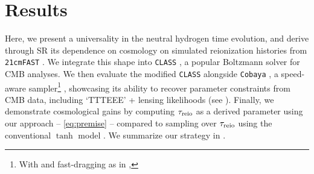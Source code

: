 \section*{Results}

Here, we present a universality in the neutral hydrogen time evolution,
and derive through SR its dependence on cosmology on simulated
reionization histories from \texttt{21cmFAST} \cite{Murray2020}.
We integrate this shape into \texttt{CLASS} \cite{Blas2011}, a popular
Boltzmann solver for CMB analyses.
We then evaluate the modified \texttt{CLASS} alongside \texttt{Cobaya}
\cite{Torrado2020}, a speed-aware sampler\cite{Lewis2002, Lewis2013}\footnote{With  and fast-dragging as
in \cite{Neal2005},  } , showcasing its ability to
recover parameter constraints from CMB data, including `TTTEEE' +
lensing likelihoods \cite{Planck2020c, Planck2020d} (see
).
Finally, we demonstrate cosmological gains by computing $\tau_{\mathrm{reio}}$ as
a derived parameter using our approach -- \cref{eq:premise} --
compared to sampling over $\tau_{\mathrm{reio}}$ using the conventional $\tanh$
model \cite{Lewis2008}.
We summarize our strategy in .

